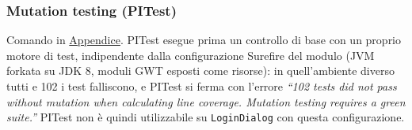 \subsubsection{Mutation testing (PITest)}

Comando in \hyperref[cmd:pitest-logindialog]{Appendice}. PITest esegue prima un controllo di
base con un proprio motore di test, indipendente dalla configurazione Surefire del modulo (JVM
forkata su JDK 8, moduli GWT esposti come risorse): in quell'ambiente diverso tutti e 102 i test
falliscono, e PITest si ferma con l'errore \textit{``102 tests did not pass without mutation when
calculating line coverage. Mutation testing requires a green suite.''} PITest non è quindi
utilizzabile su \texttt{LoginDialog} con questa configurazione.

